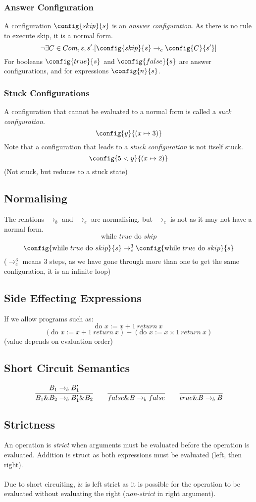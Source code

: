 \subsubsection{Answer Configuration}
A configuration $\config{skip}{s}$ is an \textit{answer configuration}. As there is no rule to execute skip, it is a normal form.
\[\neg\exists C \in Com, s, s' . [\config{skip}{s} \to_c \config{C}{s'}]\]
For booleans $\config{true}{s}$ and $\config{false}{s}$ are answer configurations, and for expressions $\config{n}{s}$.
\subsubsection{Stuck Configurations}
A configuration that cannot be evaluated to a normal form is called a \textit{suck configuration}.
\[\config{y}{(x \mapsto 3)}\]
Note that a configuration that leads to a \textit{stuck configuration} is not itself stuck.
\[\config{5 < y}{(x \mapsto 2)}\]
(Not stuck, but reduces to a stuck state)
\subsection{Normalising}
The relations $\to_b$ and $\to_e$ are normalising, but $\to_c$ is not as it may not have a normal form.
\[\text{while } true \text{ do } skip\]
\[\config{\text{while } true \text{ do } skip}{s} \to_c^3 \config{\text{while } true \text{ do } skip}{s}\]
($\to_c^3$ means 3 steps, as we have gone through more than one to get the same configuration, it is an infinite loop)
\subsection{Side Effecting Expressions}
If we allow programs such as:
\[\text{do } x := x + 1 \ return \ x\]
\[(\text{do } x := x + 1 \ return \ x) + (\text{do } x := x \times 1 \ return \ x)\]
(value depends on evaluation order)
\subsection{Short Circuit Semantics}
\[\cfrac{B_1 \to_b B'_1}{B_1 \& B_2 \to_b B_1' \& B_2} \qquad \cfrac{}{false \& B \to_b false} \qquad \cfrac{}{true \& B \to_b B}\]
\subsection{Strictness}
An operation is \textit{strict} when arguments must be evaluated before the operation is evaluated. Addition is struct as both expressions must be evaluated (left, then right).
\\
\\ Due to short circuiting, $\&$ is left strict as it is possible for the operation to be evaluated without evaluating the right (\textit{non-strict} in right argument).

